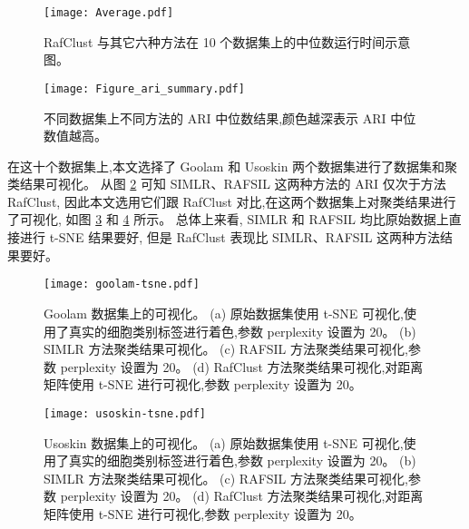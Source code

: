   \begin{figure}[!htbp]
    \centering
    \texttt{[image: Average.pdf]}
    \caption{
    RafClust 与其它六种方法在 10 个数据集上的中位数运行时间示意图。
    }
    \label{fig:running-summary}
\end{figure}

\begin{figure}[!htbp]
    \centering
    \texttt{[image: Figure\_ari\_summary.pdf]}
    \caption{
    不同数据集上不同方法的 ARI 中位数结果,颜色越深表示 ARI 中位数值越高。
    }
    \label{fig:rafari}
\end{figure}

在这十个数据集上,本文选择了 Goolam 和 Usoskin 两个数据集进行了数据集和聚类结果可视化。
从图 \ref{fig:rafari} 可知 SIMLR、RAFSIL 这两种方法的 ARI 仅次于方法 RafClust,
因此本文选用它们跟 RafClust 对比,在这两个数据集上对聚类结果进行了可视化, 
如图 \ref{fig:goolam-tsne} 和 \ref{fig:usoskin-tsne} 所示。
总体上来看, SIMLR 和 RAFSIL 均比原始数据上直接进行 t-SNE 结果要好,
但是 RafClust 表现比 SIMLR、RAFSIL 这两种方法结果要好。

\begin{figure}[!htbp]
  \centering
  \texttt{[image: goolam-tsne.pdf]}
  \caption{
  Goolam 数据集上的可视化。
  (a) 原始数据集使用 t-SNE 可视化,使用了真实的细胞类别标签进行着色,参数 perplexity 设置为 20。
  (b)  SIMLR 方法聚类结果可视化。
  (c)  RAFSIL 方法聚类结果可视化,参数 perplexity 设置为 20。
  (d)  RafClust 方法聚类结果可视化,对距离矩阵使用 t-SNE 进行可视化,参数 perplexity 设置为 20。
  }
  \label{fig:goolam-tsne}
\end{figure}


\begin{figure}[!htbp]
  \centering
  \texttt{[image: usoskin-tsne.pdf]}
  \caption{
  Usoskin 数据集上的可视化。
  (a) 原始数据集使用 t-SNE 可视化,使用了真实的细胞类别标签进行着色,参数 perplexity 设置为 20。
  (b)  SIMLR 方法聚类结果可视化。
  (c)  RAFSIL 方法聚类结果可视化,参数 perplexity 设置为 20。
  (d)  RafClust 方法聚类结果可视化,对距离矩阵使用 t-SNE 进行可视化,参数 perplexity 设置为 20。
  }
  \label{fig:usoskin-tsne}
\end{figure}



